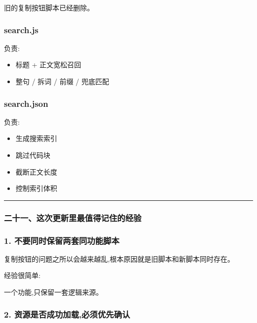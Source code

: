 \documentclass[lang=cn,scheme=chinese,color=blue,device=normal,toc=onecol,math=cm]{elegantbook}
\begin{document}
旧的复制按钮脚本已经删除。\par


\subsubsection{search.js}


负责:\par


\begin{itemize}
\item 标题 + 正文宽松召回
\item 整句 /\allowbreak{} 拆词 /\allowbreak{} 前缀 /\allowbreak{} 兜底匹配
\end{itemize}


\subsubsection{search.json}


负责:\par


\begin{itemize}
\item 生成搜索索引
\item 跳过代码块
\item 截断正文长度
\item 控制索引体积
\end{itemize}


\medskip\hrule\medskip


\subsubsection{二十一、这次更新里最值得记住的经验}


\subsubsection{1. 不要同时保留两套同功能脚本}


复制按钮的问题之所以会越来越乱,根本原因就是旧脚本和新脚本同时存在。\par


经验很简单:\par


\begin{quotebox}
一个功能,只保留一套逻辑来源。\par
\end{quotebox}


\subsubsection{2. 资源是否成功加载,必须优先确认}
\end{document}
